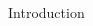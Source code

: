 \documentclass[final,hyperref={pdfpagelabels=false}]{beamer}
\begin{document}
\begin{frame}[t]
\begin{columns}[t]
\begin{column}{.465\textwidth}
\begin{block}{Introduction}
\end{block}
%
%
%
%
%
%
%
%
%        
%

\end{column}
\end{columns}
\end{frame}
\end{document}
